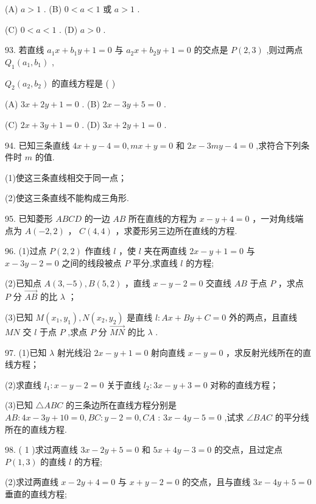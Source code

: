 \documentclass[10pt]{article}
\begin{document}
(A) \(a > 1\) . (B) \(0 < a < 1\) 或 \(a > 1\) .

(C) \(0 < a < 1\) . (D) \(a > 0\) .

93. 若直线 \({a}_{1}x + {b}_{1}y + 1 = 0\) 与 \({a}_{2}x + {b}_{2}y + 1 = 0\) 的交点是 \(P\left( {2,3}\right)\) ,则过两点 \({Q}_{1}\left( {{a}_{1},{b}_{1}}\right)\) ,

\({Q}_{2}\left( {{a}_{2},{b}_{2}}\right)\) 的直线方程是 ( )

(A) \({3x} + {2y} + 1 = 0\) . (B) \({2x} - {3y} + 5 = 0\) .

(C) \({2x} + {3y} + 1 = 0\) . (D) \({3x} + {2y} + 1 = 0\) .

94. 已知三条直线 \({4x} + y - 4 = 0,{mx} + y = 0\) 和 \({2x} - {3my} - 4 = 0\) ,求符合下列条件时 \(m\) 的值.

(1)使这三条直线相交于同一点；

(2)使这三条直线不能构成三角形.

95. 已知菱形 \({ABCD}\) 的一边 \({AB}\) 所在直线的方程为 \(x - y + 4 = 0\) ，一对角线端点为 \(A\left( {-2,2}\right)\) ， \(C\left( {4,4}\right)\) ，求菱形另三边所在直线的方程.

96. (1)过点 \(P\left( {2,2}\right)\) 作直线 \(l\) ，使 \(l\) 夹在两直线 \({2x} - y + 1 = 0\) 与 \(x - {3y} - 2 = 0\) 之间的线段被点 \(P\) 平分,求直线 \(l\) 的方程;

(2)已知点 \(A\left( {3, - 5}\right) ,B\left( {5,2}\right)\) ，直线 \(x - y - 2 = 0\) 交直线 \({AB}\) 于点 \(P\) ，求点 \(P\) 分 \(\overrightarrow{AB}\) 的比 \(\lambda\) ；

(3)已知 \(M\left( {{x}_{1},{y}_{1}}\right) ,N\left( {{x}_{2},{y}_{2}}\right)\) 是直线 \(l : {Ax} + {By} + C = 0\) 外的两点，且直线 \({MN}\) 交 \(l\) 于点 \(P\) ,求点 \(P\) 分 \(\overrightarrow{MN}\) 的比 \(\lambda\) .

97. (1)已知 \(\lambda\) 射光线沿 \({2x} - y + 1 = 0\) 射向直线 \(x - y = 0\) ，求反射光线所在的直线方程；

(2)求直线 \({l}_{1} : x - y - 2 = 0\) 关于直线 \({l}_{2} : {3x} - y + 3 = 0\) 对称的直线方程；

(3)已知 \(\bigtriangleup  {ABC}\) 的三条边所在直线方程分别是 \({AB} : {4x} - {3y} + {10} = 0,{BC} : y - 2 = 0,{CA}\) : \({3x} - {4y} - 5 = 0\) ,试求 \(\angle {BAC}\) 的平分线所在的直线方程.

98. ( 1 )求过两直线 \({3x} - {2y} + 5 = 0\) 和 \({5x} + {4y} - 3 = 0\) 的交点，且过定点 \(P\left( {1,3}\right)\) 的直线 \(l\) 的方程;

(2)求过两直线 \(x - {2y} + 4 = 0\) 与 \(x + y - 2 = 0\) 的交点，且与直线 \({3x} - {4y} + 5 = 0\) 垂直的直线方程;
\end{document}
